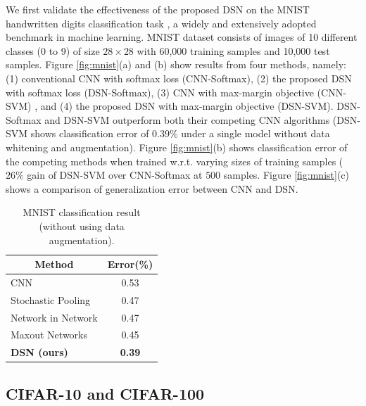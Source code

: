\documentclass{article} %
\begin{document}
We first validate the effectiveness of the proposed DSN on the MNIST handwritten digits classification task \cite{Lecun98}, a widely and extensively adopted benchmark in machine learning. MNIST dataset consists of images of 10 different classes (0 to 9) of size $28 \times 28$ with 60,000 training samples and 10,000 test samples.  Figure \ref{fig:mnist}(a) and (b) show results from four methods, namely: (1) conventional CNN with softmax loss (CNN-Softmax), (2) the proposed DSN with softmax loss (DSN-Softmax), (3) CNN with max-margin objective (CNN-SVM) , and (4) the proposed DSN with max-margin objective (DSN-SVM). DSN-Softmax and DSN-SVM outperform both their competing CNN algorithms (DSN-SVM shows classification error of $0.39\%$ under a single model without data whitening and augmentation). Figure \ref{fig:mnist}(b) shows classification error of the competing methods when trained w.r.t. varying sizes of training samples ($26\%$ gain of DSN-SVM over CNN-Softmax at $500$ samples. Figure \ref{fig:mnist}(c) shows a comparison of generalization error between CNN and DSN. %

\begin{table}[!htp]
\centering
\caption{MNIST classification result (without using data augmentation).}
	\small
	\begin{tabular}[t]{lc}
	\multicolumn{1}{c}{\bf Method}  &\multicolumn{1}{c}{\bf Error(\%)} 
	\\ \hline
	CNN \cite{objREC} & 0.53\\
	Stochastic Pooling \cite{SPool} & 0.47 \\
	Network in Network \cite{NIN} & 0.47 \\
	Maxout Networks\cite{maxout} & 0.45 \\
	\textbf{DSN (ours)} & \textbf{0.39} \\
	\end{tabular}
	\captionsetup{labelformat=empty}
\end{table}

\vspace{-3mm}
\subsection{CIFAR-10 and CIFAR-100}
\end{document}
